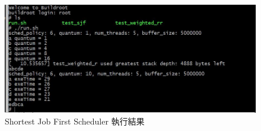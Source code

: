 \documentclass{res}
\begin{document}
\begin{resume}
\begin{figure}[htp]
    \begin{center}
        \includegraphics[width=400pt]{images/exp-sjf.jpg}
        \caption{Shortest Job First Scheduler 執行結果}
        \label{fig: result}
    \end{center}
\end{figure}

\vspace*{.1in} 

\end{resume}
\end{document}
